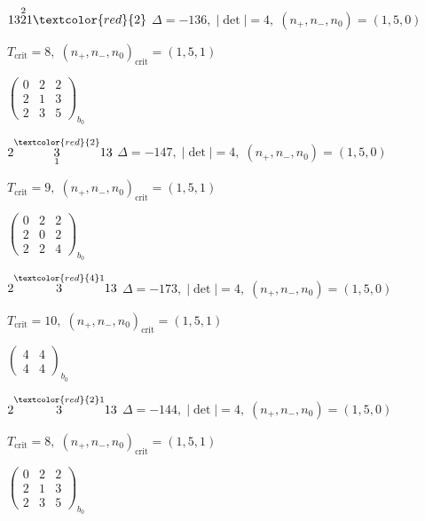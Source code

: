 \documentclass[10pt]{article}
\begin{document}
$13\overset{2}{2}1\textcolor{red}{2}$ \quad $\Delta=-136,\; |\det|=4,\; (n_+,n_-,n_0)=(1,5,0)$

\hspace{1em}$T_{\text{crit}}=8,\; (n_+,n_-,n_0)_{\text{crit}}=(1,5,1)$

\hspace{2em}$\left(\begin{smallmatrix}0 & 2 & 2 \\ 2 & 1 & 3 \\ 2 & 3 & 5\end{smallmatrix}\right)_{\!b_0}$

\smallskip

$2\overset{\textcolor{red}{2}}{\underset{1}{3}}13$ \quad $\Delta=-147,\; |\det|=4,\; (n_+,n_-,n_0)=(1,5,0)$

\hspace{1em}$T_{\text{crit}}=9,\; (n_+,n_-,n_0)_{\text{crit}}=(1,5,1)$

\hspace{2em}$\left(\begin{smallmatrix}0 & 2 & 2 \\ 2 & 0 & 2 \\ 2 & 2 & 4\end{smallmatrix}\right)_{\!b_0}$

$2\overset{\textcolor{red}{4}1}{3}13$ \quad $\Delta=-173,\; |\det|=4,\; (n_+,n_-,n_0)=(1,5,0)$

\hspace{1em}$T_{\text{crit}}=10,\; (n_+,n_-,n_0)_{\text{crit}}=(1,5,1)$

\hspace{2em}$\left(\begin{smallmatrix}4 & 4 \\ 4 & 4\end{smallmatrix}\right)_{\!b_0}$

$2\overset{\textcolor{red}{2}1}{3}13$ \quad $\Delta=-144,\; |\det|=4,\; (n_+,n_-,n_0)=(1,5,0)$

\hspace{1em}$T_{\text{crit}}=8,\; (n_+,n_-,n_0)_{\text{crit}}=(1,5,1)$

\hspace{2em}$\left(\begin{smallmatrix}0 & 2 & 2 \\ 2 & 1 & 3 \\ 2 & 3 & 5\end{smallmatrix}\right)_{\!b_0}$
\end{document}
